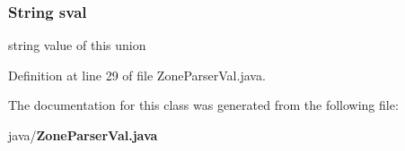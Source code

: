 \subsubsection[{sval}]{\setlength{\rightskip}{0pt plus 5cm}String sval}\label{classorg_1_1smallfoot_1_1parser_1_1zone_1_1ZoneParserVal_a277083a86232087ccdbaa1f691f3a3ff}


string value of this \textquotesingle{}union\textquotesingle{} 



Definition at line 29 of file Zone\+Parser\+Val.\+java.



The documentation for this class was generated from the following file\+:\begin{DoxyCompactItemize}
\item 
java/{\bf Zone\+Parser\+Val.\+java}\end{DoxyCompactItemize}

